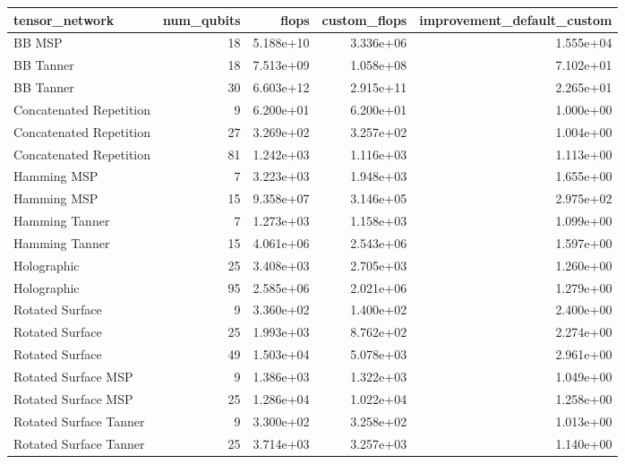 \begin{tabular}{lrrrr}
\toprule
tensor_network & num_qubits & flops & custom_flops & improvement_default_custom \\
\midrule
BB MSP & 18 & 5.188e+10 & 3.336e+06 & 1.555e+04 \\
BB Tanner & 18 & 7.513e+09 & 1.058e+08 & 7.102e+01 \\
BB Tanner & 30 & 6.603e+12 & 2.915e+11 & 2.265e+01 \\
Concatenated Repetition & 9 & 6.200e+01 & 6.200e+01 & 1.000e+00 \\
Concatenated Repetition & 27 & 3.269e+02 & 3.257e+02 & 1.004e+00 \\
Concatenated Repetition & 81 & 1.242e+03 & 1.116e+03 & 1.113e+00 \\
Hamming MSP & 7 & 3.223e+03 & 1.948e+03 & 1.655e+00 \\
Hamming MSP & 15 & 9.358e+07 & 3.146e+05 & 2.975e+02 \\
Hamming Tanner & 7 & 1.273e+03 & 1.158e+03 & 1.099e+00 \\
Hamming Tanner & 15 & 4.061e+06 & 2.543e+06 & 1.597e+00 \\
Holographic & 25 & 3.408e+03 & 2.705e+03 & 1.260e+00 \\
Holographic & 95 & 2.585e+06 & 2.021e+06 & 1.279e+00 \\
Rotated Surface & 9 & 3.360e+02 & 1.400e+02 & 2.400e+00 \\
Rotated Surface & 25 & 1.993e+03 & 8.762e+02 & 2.274e+00 \\
Rotated Surface & 49 & 1.503e+04 & 5.078e+03 & 2.961e+00 \\
Rotated Surface MSP & 9 & 1.386e+03 & 1.322e+03 & 1.049e+00 \\
Rotated Surface MSP & 25 & 1.286e+04 & 1.022e+04 & 1.258e+00 \\
Rotated Surface Tanner & 9 & 3.300e+02 & 3.258e+02 & 1.013e+00 \\
Rotated Surface Tanner & 25 & 3.714e+03 & 3.257e+03 & 1.140e+00 \\
\bottomrule
\end{tabular}

